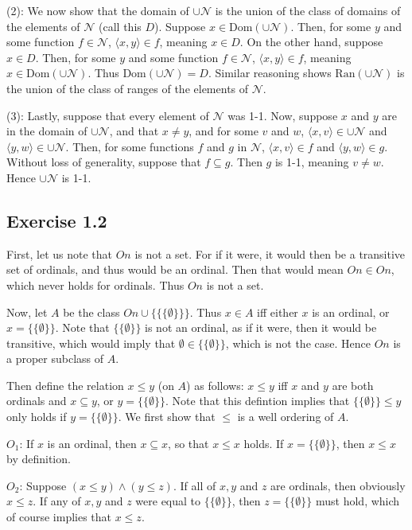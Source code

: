 \documentclass{article}
\theoremstyle{definition}
\begin{document}
(2): We now show that the domain of $\cup\mathcal{N}$ is the union of the class of domains of the elements of $\mathcal{N}$ (call this $D$). Suppose 
$x\in\textrm{Dom}(\cup\mathcal{N})$. Then, for some $y$ and some function $f\in\mathcal{N}$, $\langle x,y\rangle\in f$, meaning $x\in D$. On the other hand, suppose 
$x\in D$. Then, for some $y$ and some function $f\in\mathcal{N}$, $\langle x,y\rangle\in f$, meaning $x\in\textrm{Dom}(\cup\mathcal{N})$. Thus $\textrm{Dom}(\cup\mathcal{N})=D$. 
Similar reasoning shows $\textrm{Ran}(\cup\mathcal{N})$ is the union of the class of ranges of the elements of $\mathcal{N}$.

(3): Lastly, suppose that every element of $\mathcal{N}$ was 1-1. Now, suppose $x$ and $y$ are in the domain of $\cup\mathcal{N}$, and that $x\ne y$, and 
for some $v$ and $w$, $\langle x,v\rangle\in\cup\mathcal{N}$ and $\langle y,w\rangle\in\cup\mathcal{N}$. 
Then, for some functions $f$ and $g$ in $\mathcal{N}$, $\langle x,v\rangle\in f$ and $\langle y,w\rangle\in g$. 
Without loss of generality, suppose that $f\subseteq g$. Then $g$ is 1-1, meaning $v\ne w$. Hence $\cup\mathcal{N}$ is 1-1.

\subsection*{Exercise 1.2}
First, let us note that $On$ is not a set. For if it were, it would then be a transitive set of ordinals, and thus would be an ordinal. Then that would mean 
$On\in On$, which never holds for ordinals. Thus $On$ is not a set.

Now, let $A$ be the class $On\cup\{\{\{\emptyset\}\}\}$. Thus $x\in A$ iff either $x$ is an ordinal, or $x=\{\{\emptyset\}\}$. Note that 
$\{\{\emptyset\}\}$ is not an ordinal, as if it were, then it would be transitive, which would imply that $\emptyset\in\{\{\emptyset\}\}$, which 
is not the case. Hence $On$ is a proper subclass of $A$.

Then define the relation $x\le y$ (on $A$) as follows: $x\le y$ iff $x$ and $y$ are both ordinals and $x\subseteq y$, or $y=\{\{\emptyset\}\}$. Note that this defintion 
implies that $\{\{\emptyset\}\}\le y$ only holds if $y=\{\{\emptyset\}\}$. We first show that 
$\le$ is a well ordering of $A$.

$O_1$: If $x$ is an ordinal, then $x\subseteq x$, so that $x\le x$ holds. If $x=\{\{\emptyset\}\}$, then $x\le x$ by definition.

$O_2$: Suppose $(x\le y)\wedge (y\le z)$. If all of $x,y$ and $z$ are ordinals, then obviously $x\le z$. If any of 
$x,y$ and $z$ were equal to $\{\{\emptyset\}\}$, then $z=\{\{\emptyset\}\}$ must hold, which of course implies that 
$x\le z$. 
\end{document}
